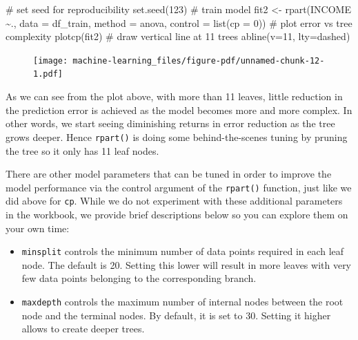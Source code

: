 \documentclass[
  letterpaper,
  DIV=11,
  numbers=noendperiod]{scrreprt}
\newenvironment{Shaded}{\begin{snugshade}}{\end{snugshade}}
\newcommand{\AttributeTok}[1]{\textcolor[rgb]{0.40,0.45,0.13}{#1}}
\newcommand{\CommentTok}[1]{\textcolor[rgb]{0.37,0.37,0.37}{#1}}
\newcommand{\DecValTok}[1]{\textcolor[rgb]{0.68,0.00,0.00}{#1}}
\newcommand{\FunctionTok}[1]{\textcolor[rgb]{0.28,0.35,0.67}{#1}}
\newcommand{\NormalTok}[1]{\textcolor[rgb]{0.00,0.23,0.31}{#1}}
\newcommand{\OtherTok}[1]{\textcolor[rgb]{0.00,0.23,0.31}{#1}}
\newcommand{\SpecialCharTok}[1]{\textcolor[rgb]{0.37,0.37,0.37}{#1}}
\newcommand{\StringTok}[1]{\textcolor[rgb]{0.13,0.47,0.30}{#1}}
\begin{document}
\begin{Shaded}
\begin{Highlighting}[]
\CommentTok{\# set seed for reproducibility}
\FunctionTok{set.seed}\NormalTok{(}\DecValTok{123}\NormalTok{)}
\CommentTok{\# train model}
\NormalTok{fit2 }\OtherTok{\textless{}{-}} \FunctionTok{rpart}\NormalTok{(INCOME }\SpecialCharTok{\textasciitilde{}}\NormalTok{., }\AttributeTok{data =}\NormalTok{ df\_train, }\AttributeTok{method =} \StringTok{\textquotesingle{}anova\textquotesingle{}}\NormalTok{, }\AttributeTok{control =} \FunctionTok{list}\NormalTok{(}\AttributeTok{cp =} \DecValTok{0}\NormalTok{))}
\CommentTok{\# plot error vs tree complexity }
\FunctionTok{plotcp}\NormalTok{(fit2)}
\CommentTok{\# draw vertical line at 11 trees}
\FunctionTok{abline}\NormalTok{(}\AttributeTok{v=}\DecValTok{11}\NormalTok{, }\AttributeTok{lty=}\StringTok{\textquotesingle{}dashed\textquotesingle{}}\NormalTok{)}
\end{Highlighting}
\end{Shaded}

\begin{figure}[H]

{\centering \texttt{[image: machine-learning\_files/figure-pdf/unnamed-chunk-12-1.pdf]}

}

\end{figure}

As we can see from the plot above, with more than 11 leaves, little
reduction in the prediction error is achieved as the model becomes more
and more complex. In other words, we start seeing diminishing returns in
error reduction as the tree grows deeper. Hence \texttt{rpart()} is
doing some behind-the-scenes tuning by pruning the tree so it only has
11 leaf nodes.

There are other model parameters that can be tuned in order to improve
the model performance via the control argument of the \texttt{rpart()}
function, just like we did above for \texttt{cp}. While we do not
experiment with these additional parameters in the workbook, we provide
brief descriptions below so you can explore them on your own time:

\begin{itemize}
\item
  \texttt{minsplit} controls the minimum number of data points required
  in each leaf node. The default is 20. Setting this lower will result
  in more leaves with very few data points belonging to the
  corresponding branch.
\item
  \texttt{maxdepth} controls the maximum number of internal nodes
  between the root node and the terminal nodes. By default, it is set to
  30. Setting it higher allows to create deeper trees.
\end{itemize}
\end{document}
